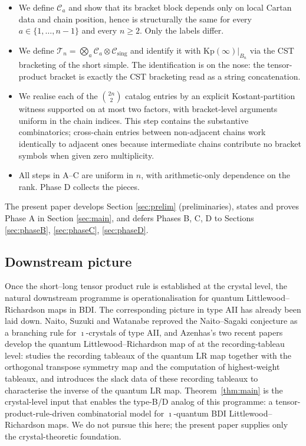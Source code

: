 \documentclass[11pt]{article}
\theoremstyle{definition}
\theoremstyle{remark}
\newcommand{\Kp}{\mathrm{Kp}}
\newcommand{\Cmid}{\mathcal{C}}
\newcommand{\Csing}{\mathcal{C}_{\mathrm{sing}}}
\newcommand{\TT}{\mathcal{T}}
\begin{document}
\begin{itemize}[leftmargin=2em]
  \item[\textbf{Phase A: Chain factor uniformity.}] We define $\Cmid_a$ and show that its
    bracket block depends only on local Cartan data and chain position, hence is structurally
    the same for every $a \in \{1, \ldots, n-1\}$ and every $n \geq 2$. Only the labels
    differ.
  \item[\textbf{Phase B: Tensor product as $\imath$-crystal.}] We define
    $\TT_n = \bigotimes_a \Cmid_a \otimes \Csing$ and identify it with $\Kp(\infty)|_{B_n}$
    via the CST bracketing of the short simple. The identification is on the nose: the
    tensor-product bracket is exactly the CST bracketing read as a string concatenation.
  \item[\textbf{Phase C: Catalog factor-by-factor.}] We realise each of the $\binom{2n}{2}$
    catalog entries by an explicit Kostant-partition witness supported on at most two factors,
    with bracket-level arguments uniform in the chain indices. This step contains the
    substantive combinatorics; cross-chain entries between non-adjacent chains work
    identically to adjacent ones because intermediate chains contribute no bracket symbols
    when given zero multiplicity.
  \item[\textbf{Phase D: Type-uniformity wrap.}] All steps in A--C are uniform in $n$, with
    arithmetic-only dependence on the rank. Phase D collects the pieces.
\end{itemize}

The present paper develops Section \ref{sec:prelim} (preliminaries), states and proves Phase A
in Section \ref{sec:main}, and defers Phases B, C, D to Sections \ref{sec:phaseB},
\ref{sec:phaseC}, \ref{sec:phaseD}.

\subsection{Downstream picture}\label{ssec:downstream}

Once the short--long tensor product rule is established at the crystal level, the natural
downstream programme is operationalisation for quantum Littlewood--Richardson maps in BDI.
The corresponding picture in type AII has already been laid down. Naito, Suzuki and
Watanabe \cite{NSW2024} reproved the Naito--Sagaki conjecture as a branching rule for
$\imath$-crystals of type AII, and
Azenhas's two recent papers \cite{Azenhas2603,Azenhas2604} develop the quantum
Littlewood--Richardson map of \cite{Watanabe2110} at the recording-tableau level:
\cite{Azenhas2603} studies the recording tableaux of the quantum LR map together with the
orthogonal transpose symmetry map and the computation of highest-weight tableaux, and
\cite{Azenhas2604} introduces the slack data of these recording tableaux to characterise
the inverse of the quantum LR map. Theorem~\ref{thm:main} is the
crystal-level input that enables the type-B/D analog of this programme: a
tensor-product-rule-driven combinatorial model for $\imath$-quantum BDI Littlewood--Richardson
maps. We do not pursue this here; the present paper supplies only the crystal-theoretic
foundation.
\end{document}
